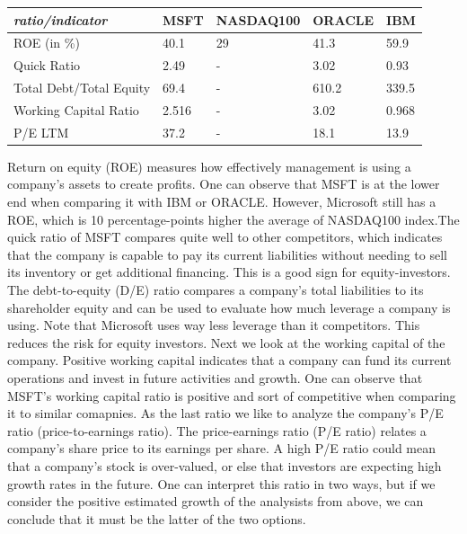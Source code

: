 \documentclass[]{article}
\begin{document}
\begin{table}[h]
	\begin{tabular}{|l|l|l|l|l|}
		\hline
		\textit{\textbf{ratio/indicator}} & \textbf{MSFT} & \textbf{NASDAQ100} & \textbf{ORACLE} & \textbf{IBM} \\ \hline
		ROE (in \%) & 40.1 & 29 & 41.3 & 59.9 \\ \hline
		Quick Ratio & 2.49 & - & 3.02 & 0.93 \\ \hline
		Total Debt/Total Equity & 69.4 & - & 610.2 & 339.5 \\ \hline
		Working Capital Ratio & 2.516 & - & 3.02 & 0.968 \\ \hline
		P/E LTM & 37.2 & - & 18.1 & 13.9 \\ \hline
	\end{tabular}
\end{table}
\noindent Return on equity (ROE) measures how effectively management is using a company’s assets to create profits. One can observe that MSFT is at the lower end when comparing it with IBM or ORACLE. However, Microsoft still has a ROE, which is 10 percentage-points higher the average of NASDAQ100 index.The quick ratio of MSFT compares quite well to other competitors, which indicates that the company is capable to pay its current liabilities without needing to sell its inventory or get additional financing. This is a good sign for equity-investors. The debt-to-equity (D/E) ratio compares a company’s total liabilities to its shareholder equity and can be used to evaluate how much leverage a company is using. Note that Microsoft uses way less leverage than it competitors. This reduces the risk for equity investors. Next we look at the working capital of the company. Positive working capital indicates that a company can fund its current operations and invest in future activities and growth. One can observe that MSFT's working capital ratio is positive and sort of competitive when comparing it to similar comapnies. As the last ratio we like to analyze the company's P/E ratio (price-to-earnings ratio). The price-earnings ratio (P/E ratio) relates a company's share price to its earnings per share. A high P/E ratio could mean that a company's stock is over-valued, or else that investors are expecting high growth rates in the future. One can interpret this ratio in two ways, but if we consider the positive estimated growth of the analysists from above, we can conclude that it must be the latter of the two options.
\end{document}
